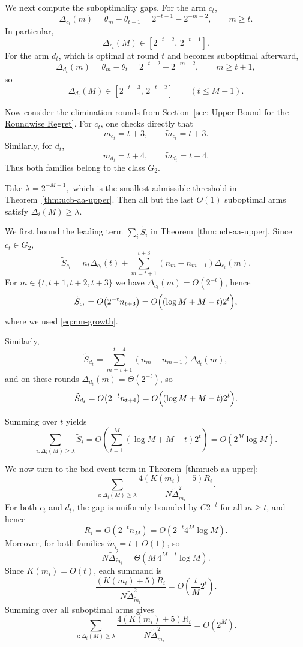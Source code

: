\documentclass[
  12pt]{article}
\begin{document}
We next compute the suboptimality gaps. For the arm $c_t$,
\[
\Delta_{c_t}(m)
=
\theta_m-\theta_{t-1}
=
2^{-t-1}-2^{-m-2},
\qquad m\ge t.
\]
In particular,
\[
\Delta_{c_t}(M)\in [2^{-t-2},\,2^{-t-1}].
\]
For the arm $d_t$, which is optimal at round $t$ and becomes suboptimal afterward,
\[
\Delta_{d_t}(m)
=
\theta_m-\theta_t
=
2^{-t-2}-2^{-m-2},
\qquad m\ge t+1,
\]
so
\[
\Delta_{d_t}(M)\in [2^{-t-3},\,2^{-t-2}]
\qquad (t\le M-1).
\]

Now consider the elimination rounds from Section~\ref{sec: Upper Bound for the Roundwise Regret}. For $c_t$, one checks directly that
\[
m_{c_t}=t+3,
\qquad
\tilde m_{c_t}=t+3.
\]
Similarly, for $d_t$,
\[
m_{d_t}=t+4,
\qquad
\tilde m_{d_t}=t+4.
\]
Thus both families belong to the class $G_2$.

Take
\(
\lambda = 2^{-M+1},
\)
which is the smallest admissible threshold in Theorem~\ref{thm:ucb-aa-upper}. Then all but the last $O(1)$
suboptimal arms satisfy $\Delta_i(M)\ge \lambda$.

We first bound the leading term $\sum_i \tilde S_i$ in Theorem~\ref{thm:ucb-aa-upper}.
Since $c_t\in G_2$,
\[
\tilde S_{c_t}
=
n_t\Delta_{c_t}(t)
+
\sum_{m=t+1}^{t+3} (n_m-n_{m-1})\Delta_{c_t}(m).
\]
For $m\in\{t,t+1,t+2,t+3\}$ we have $\Delta_{c_t}(m)=\Theta(2^{-t})$, hence
\[
\tilde S_{c_t}
=
O\bigl(2^{-t}n_{t+3}\bigr)
=
O\Bigl((\log M+M-t)2^t\Bigr),
\]
where we used \eqref{eq:nm-growth}.

Similarly,
\[
\tilde S_{d_t}
=
\sum_{m=t+1}^{t+4} (n_m-n_{m-1})\Delta_{d_t}(m),
\]
and on these rounds $\Delta_{d_t}(m)=\Theta(2^{-t})$, so
\[
\tilde S_{d_t}
=
O\bigl(2^{-t}n_{t+4}\bigr)
=
O\Bigl((\log M+M-t)2^t\Bigr).
\]

Summing over $t$ yields
\begin{equation}
\label{eq:Si-sum}
\sum_{i:\Delta_i(M)\ge\lambda} \tilde S_i
=
O\left(
\sum_{t=1}^{M} (\log M+M-t)2^t
\right)
=
O(2^M\log M).
\end{equation}

We now turn to the bad-event term in Theorem~\ref{thm:ucb-aa-upper}:
\[
\sum_{i:\Delta_i(M)\ge\lambda}
\frac{4(K(m_i)+5)R_i}{N\tilde\Delta_{\tilde m_i}^2}.
\]
For both $c_t$ and $d_t$, the gap is uniformly bounded by $C2^{-t}$ for all $m\ge t$, and
hence
\[
R_i = O(2^{-t}n_M)=O(2^{-t}4^M\log M).
\]
Moreover, for both families $\tilde m_i=t+O(1)$, so
\[
N\tilde\Delta_{\tilde m_i}^2
=
\Theta(M\,4^{M-t}\log M).
\]
Since $K(m_i)=O(t)$, each summand is
\[
\frac{(K(m_i)+5)R_i}{N\tilde\Delta_{\tilde m_i}^2}
=
O\left(\frac{t}{M}2^t\right).
\]
Summing over all suboptimal arms gives
\begin{equation}
\label{eq:bad-term}
\sum_{i:\Delta_i(M)\ge\lambda}
\frac{4(K(m_i)+5)R_i}{N\tilde\Delta_{\tilde m_i}^2}
=
O(2^M).
\end{equation}
\end{document}
